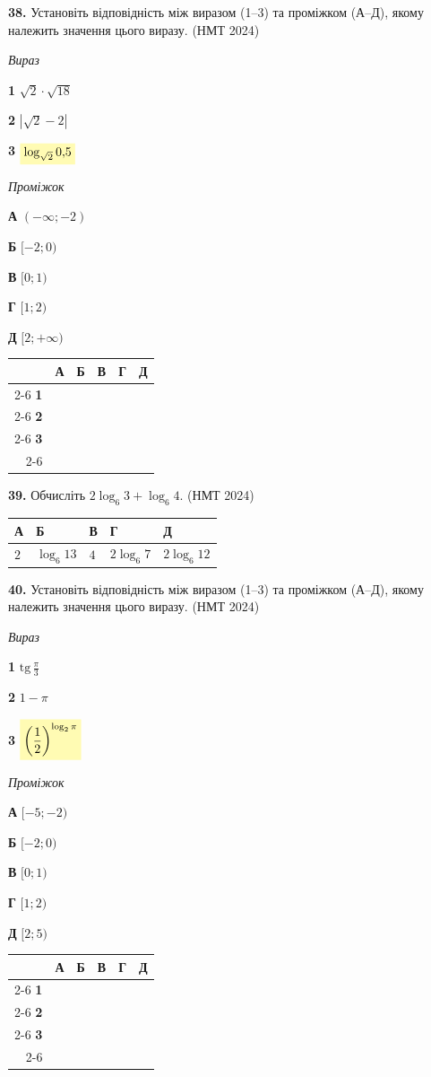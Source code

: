 \documentclass[14pt]{extarticle}
\newcommand{\answerGrid}{
    \begingroup
    \renewcommand{\arraystretch}{1.3} 
    \setlength{\tabcolsep}{7pt} 
    \begin{tabular}{r|c|c|c|c|c|}
         \multicolumn{1}{c}{} & \multicolumn{1}{c}{\textbf{А}} & \multicolumn{1}{c}{\textbf{Б}} & \multicolumn{1}{c}{\textbf{В}} & \multicolumn{1}{c}{\textbf{Г}} & \multicolumn{1}{c}{\textbf{Д}} \\ \cline{2-6}
         \textbf{1} & & & & & \\ \cline{2-6}
         \textbf{2} & & & & & \\ \cline{2-6}
         \textbf{3} & & & & & \\ \cline{2-6}
    \end{tabular}
    \endgroup
}
\newcommand{\matchingLayout}[3]{
    \noindent
    \begin{minipage}[t]{0.40\textwidth}
        #1
    \end{minipage}%
    \hfill
    \begin{minipage}[t]{0.28\textwidth}
        #2
    \end{minipage}%
    \hfill
    \begin{minipage}[t]{0.30\textwidth}
        \vspace{0pt}
        \begin{flushright}
        #3
        \end{flushright}
    \end{minipage}
}
\newcommand{\answerTable}[5]{
\begin{center}
\begin{tabular}{|*{5}{>{\centering\arraybackslash}m{2.8cm}|}}
\hline
\rule[-0.3cm]{0pt}{0.8cm}\textbf{А} & \textbf{Б} & \textbf{В} & \textbf{Г} & \textbf{Д} \\
\hline
\rule[-0.4cm]{0pt}{1.0cm}#1 & \rule[-0.4cm]{0pt}{1.0cm}#2 & \rule[-0.4cm]{0pt}{1.0cm}#3 & \rule[-0.4cm]{0pt}{1.0cm}#4 & \rule[-0.4cm]{0pt}{1.0cm}#5 \\
\hline
\end{tabular}
\end{center}
}
\newcommand{\nmtyear}[1]{\hfill{\small\color{yearcolor}(НМТ #1)}}
\begin{document}
\vspace{0.8cm}

\noindent\textbf{38.} Установіть відповідність між виразом (1--3) та проміжком (А--Д), якому належить значення цього виразу. \nmtyear{2024}
\vspace{0.3cm}

\matchingLayout{\textit{Вираз}

\textbf{1} \quad $\sqrt{2} \cdot \sqrt{18}$

\textbf{2} \quad $|\sqrt{2} - 2|$

\textbf{3} \quad $\colorbox{yellow!30}{$\log_{\sqrt{2}} 0{,}5$}$
}{
\textit{Проміжок}

\textbf{А} \quad $(-\infty; -2)$

\textbf{Б} \quad $[-2; 0)$

\textbf{В} \quad $[0; 1)$

\textbf{Г} \quad $[1; 2)$

\textbf{Д} \quad $[2; +\infty)$
}{
\answerGrid
}

\vspace{0.8cm}

\noindent\textbf{39.} Обчисліть $2\log_6 3 + \log_6 4$. \nmtyear{2024}
\vspace{0.3cm}

\answerTable{$2$}{$\log_6 13$}{$4$}{$2\log_6 7$}{$2\log_6 12$}

\vspace{0.5cm}

\noindent\textbf{40.} Установіть відповідність між виразом (1--3) та проміжком (А--Д), якому належить значення цього виразу. \nmtyear{2024}
\vspace{0.3cm}

\matchingLayout{\textit{Вираз}

\textbf{1} \quad $\mathrm{tg}\,\displaystyle\frac{\pi}{3}$

\textbf{2} \quad $1 - \pi$

\textbf{3} \quad $\colorbox{yellow!30}{$\left(\dfrac{1}{2}\right)^{\log_2 \pi}$}$
}{
\textit{Проміжок}

\textbf{А} \quad $[-5; -2)$

\textbf{Б} \quad $[-2; 0)$

\textbf{В} \quad $[0; 1)$

\textbf{Г} \quad $[1; 2)$

\textbf{Д} \quad $[2; 5)$
}{
\answerGrid
}

\vspace{0.8cm}
\end{document}
